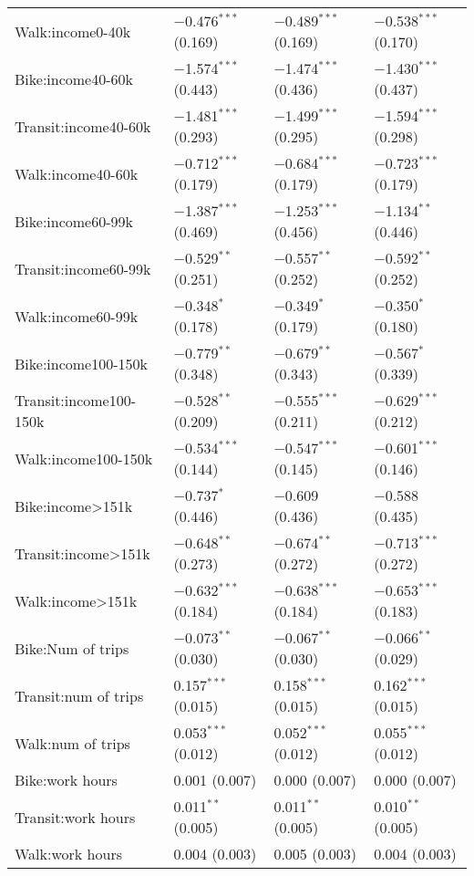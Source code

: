 \begin{longtabu}{llll}
  Walk:income0-40k & $-$0.476$^{***}$ (0.169) & $-$0.489$^{***}$ (0.169) & $-$0.538$^{***}$ (0.170) \\ 
  Bike:income40-60k & $-$1.574$^{***}$ (0.443) & $-$1.474$^{***}$ (0.436) & $-$1.430$^{***}$ (0.437) \\ 
  Transit:income40-60k & $-$1.481$^{***}$ (0.293) & $-$1.499$^{***}$ (0.295) & $-$1.594$^{***}$ (0.298) \\ 
  Walk:income40-60k & $-$0.712$^{***}$ (0.179) & $-$0.684$^{***}$ (0.179) & $-$0.723$^{***}$ (0.179) \\ 
  Bike:income60-99k & $-$1.387$^{***}$ (0.469) & $-$1.253$^{***}$ (0.456) & $-$1.134$^{**}$ (0.446) \\ 
  Transit:income60-99k & $-$0.529$^{**}$ (0.251) & $-$0.557$^{**}$ (0.252) & $-$0.592$^{**}$ (0.252) \\ 
  Walk:income60-99k & $-$0.348$^{*}$ (0.178) & $-$0.349$^{*}$ (0.179) & $-$0.350$^{*}$ (0.180) \\ 
  Bike:income100-150k & $-$0.779$^{**}$ (0.348) & $-$0.679$^{**}$ (0.343) & $-$0.567$^{*}$ (0.339) \\ 
  Transit:income100-150k & $-$0.528$^{**}$ (0.209) & $-$0.555$^{***}$ (0.211) & $-$0.629$^{***}$ (0.212) \\ 
  Walk:income100-150k & $-$0.534$^{***}$ (0.144) & $-$0.547$^{***}$ (0.145) & $-$0.601$^{***}$ (0.146) \\ 
  Bike:income\textgreater 151k & $-$0.737$^{*}$ (0.446) & $-$0.609 (0.436) & $-$0.588 (0.435) \\ 
  Transit:income\textgreater 151k & $-$0.648$^{**}$ (0.273) & $-$0.674$^{**}$ (0.272) & $-$0.713$^{***}$ (0.272) \\ 
  Walk:income\textgreater 151k & $-$0.632$^{***}$ (0.184) & $-$0.638$^{***}$ (0.184) & $-$0.653$^{***}$ (0.183) \\ 
  Bike:Num of trips & $-$0.073$^{**}$ (0.030) & $-$0.067$^{**}$ (0.030) & $-$0.066$^{**}$ (0.029) \\ 
  Transit:num of trips & 0.157$^{***}$ (0.015) & 0.158$^{***}$ (0.015) & 0.162$^{***}$ (0.015) \\ 
  Walk:num of trips & 0.053$^{***}$ (0.012) & 0.052$^{***}$ (0.012) & 0.055$^{***}$ (0.012) \\ 
  Bike:work hours & 0.001 (0.007) & 0.000 (0.007) & 0.000 (0.007) \\ 
  Transit:work hours & 0.011$^{**}$ (0.005) & 0.011$^{**}$ (0.005) & 0.010$^{**}$ (0.005) \\ 
  Walk:work hours & 0.004 (0.003) & 0.005 (0.003) & 0.004 (0.003) \\ 

\end{longtabu}
